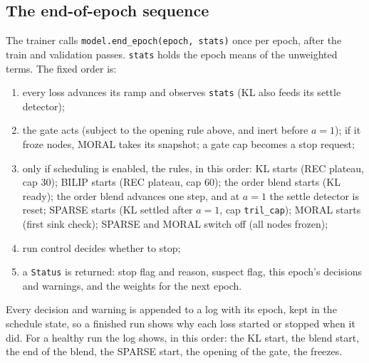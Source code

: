 \subsection{The end-of-epoch sequence}
\label{sec:schedule:sequence}
The trainer calls \texttt{model.end\_epoch(epoch, stats)} once per epoch, after the
train and validation passes. \texttt{stats} holds the epoch means of the unweighted
terms. The fixed order is:
\begin{enumerate}[label=(\arabic*),leftmargin=2em]
\item every loss advances its ramp and observes \texttt{stats} (KL also feeds its
      settle detector);
\item the gate acts (subject to the opening rule above, and inert before $a=1$); if it
      froze nodes, MORAL takes its snapshot; a gate cap becomes a stop request;
\item only if scheduling is enabled, the rules, in this order: KL starts (REC plateau,
      cap 30); BILIP starts (REC plateau, cap 60); the order blend starts (KL ready);
      the order blend advances one step, and at $a=1$ the settle detector is reset;
      SPARSE starts (KL settled after $a=1$, cap \texttt{tril\_cap}); MORAL starts
      (first sink check); SPARSE and MORAL switch off (all nodes frozen);
\item run control decides whether to stop;
\item a \texttt{Status} is returned: stop flag and reason, suspect flag, this epoch's
      decisions and warnings, and the weights for the next epoch.
\end{enumerate}
Every decision and warning is appended to a log with its epoch, kept in the schedule
state, so a finished run shows why each loss started or stopped when it did. For a
healthy run the log shows, in this order: the KL start, the blend start, the end of
the blend, the SPARSE start, the opening of the gate, the freezes.


